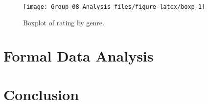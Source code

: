 \documentclass[
]{article}
\begin{document}
\begin{figure}[H]

{\centering \texttt{[image: Group\_08\_Analysis\_files/figure-latex/boxp-1]} 

}

\caption{\label{fig:boxp1} Boxplot of rating by genre.}\label{fig:boxp}
\end{figure}

\hypertarget{sec:form}{%
\section{Formal Data Analysis}\label{sec:form}}

\hypertarget{sec:conc}{%
\section{Conclusion}\label{sec:conc}}
\end{document}
